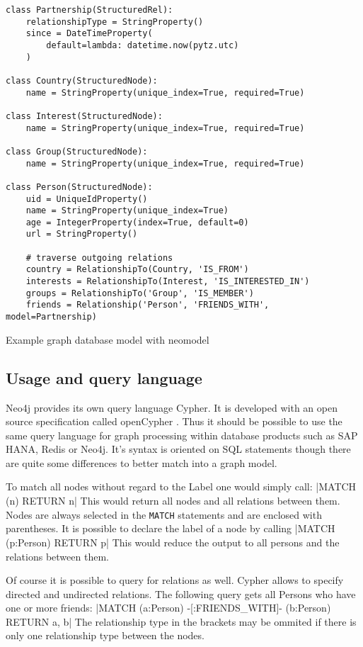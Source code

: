 \begin{listing}[ht]
\begin{verbatim}
class Partnership(StructuredRel):
    relationshipType = StringProperty()
    since = DateTimeProperty(
        default=lambda: datetime.now(pytz.utc)
    )

class Country(StructuredNode):
    name = StringProperty(unique_index=True, required=True)

class Interest(StructuredNode):
    name = StringProperty(unique_index=True, required=True)

class Group(StructuredNode):
    name = StringProperty(unique_index=True, required=True)

class Person(StructuredNode):
    uid = UniqueIdProperty()
    name = StringProperty(unique_index=True)
    age = IntegerProperty(index=True, default=0)
    url = StringProperty()

    # traverse outgoing relations
    country = RelationshipTo(Country, 'IS_FROM')
    interests = RelationshipTo(Interest, 'IS_INTERESTED_IN')
    groups = RelationshipTo('Group', 'IS_MEMBER')
    friends = Relationship('Person', 'FRIENDS_WITH', model=Partnership)
\end{verbatim}
\caption{Example graph database model with neomodel}
\label{lst:graphdb:neomodel}
\end{listing}

\subsection{Usage and query language}
\label{sec:graphdb:cypher}
Neo4j provides its own query language Cypher. It is developed with an open source specification called openCypher \autocite{openCypher}.
Thus it should be possible to use the same query language for graph processing within database products such as SAP HANA, Redis or Neo4j.
It's syntax is oriented on SQL statements though there are quite some differences to better match into a graph model.

To match all nodes without regard to the Label one would simply call: |MATCH (n) RETURN n|
This would return all nodes and all relations between them.
Nodes are always selected in the \texttt{MATCH} statements and are enclosed with parentheses.
It is possible to declare the label of a node by calling |MATCH (p:Person) RETURN p|
This would reduce the output to all persons and the relations between them.

Of course it is possible to query for relations as well.
Cypher allows to specify directed and undirected relations.
The following query gets all Persons who have one or more friends: |MATCH (a:Person) -[:FRIENDS_WITH]- (b:Person) RETURN a, b|
The relationship type in the brackets may be ommited if there is only one relationship type between the nodes.

